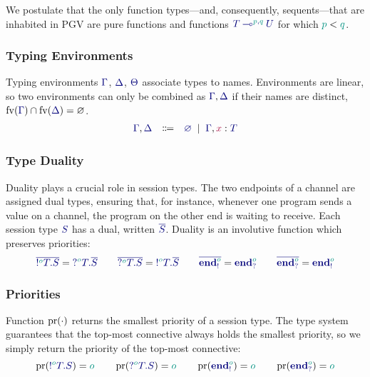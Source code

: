 We postulate that the only function types---and, consequently, sequents---that are inhabited in PGV are pure functions and functions $\ty{\tylolli[\cs{p},\cs{q}]{T}{U}}$ for which $\cs{p}<\cs{q}$.

\subsubsection*{Typing Environments}
Typing environments $\ty{\Gamma}$, $\ty{\Delta}$, $\ty{\Theta}$ associate types to names. Environments are linear, so two environments can only be combined as $\ty{\Gamma}, \ty{\Delta}$ if their names are distinct, \ie $\fv(\ty{\Gamma})\cap\fv(\ty{\Delta})=\varnothing$.
\[
  \begin{array}{lcl}
    \ty{\Gamma}, \ty{\Delta}
     & \Coloneqq & \ty{\emptyenv}
    \sep        \ty{\Gamma}, \tmty{x}{T}
  \end{array}
\]

\subsubsection*{Type Duality}
Duality plays a crucial role in session types. The two endpoints of a channel are assigned dual types, ensuring that, for instance, whenever one program {sends} a value on a channel, the program on the other end is waiting to {receive}. Each session type $\ty{S}$ has a dual, written $\ty{\co{S}}$. Duality is an involutive function which {preserves priorities}:
\[
  \ty{\co{\tysend[\cs{o}]{T}{S}}} = \ty{\tyrecv[\cs{o}]{T}{\co{S}}}
  \qquad
  \ty{\co{\tyrecv[\cs{o}]{T}{S}}} = \ty{\tysend[\cs{o}]{T}{\co{S}}}
  \qquad
  \ty{\co{\tyends[\cs{o}]}} = \ty{\tyendr[\cs{o}]}
  \qquad
  \ty{\co{\tyendr[\cs{o}]}} = \ty{\tyends[\cs{o}]}
\]

\subsubsection*{Priorities}
Function $\operatorname{pr}(\cdot)$ returns the smallest priority of a session type. The type system guarantees that the top-most connective always holds the smallest priority, so we simply return the priority of the top-most connective:
\[
  \pr(\ty{\tysend[\cs{o}]{T}{S}}) = \cs{o}
  \qquad
  \pr(\ty{\tyrecv[\cs{o}]{T}{S}}) = \cs{o}
  \qquad
  \pr(\ty{\tyends[\cs{o}]})       = \cs{o}
  \qquad
  \pr(\ty{\tyendr[\cs{o}]})       = \cs{o}
\]

